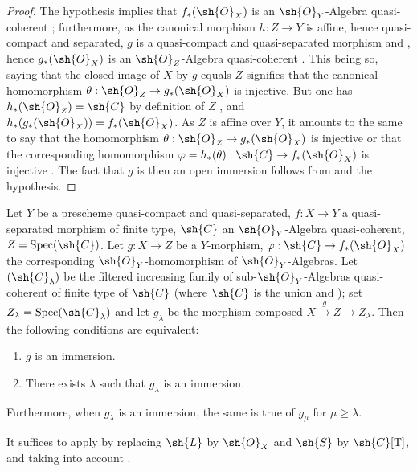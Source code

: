 \begin{proof}
The hypothesis implies that $f_*(\sh{O}_X)$ is an $\sh{O}_Y$-Algebra quasi-coherent ; furthermore, as the canonical morphism $h:Z\to Y$ is affine, hence quasi-compact and separated, $g$ is a quasi-compact and quasi-separated morphism  and , hence $g_*(\sh{O}_X)$ is an $\sh{O}_Z$-Algebra quasi-coherent .
This being so, saying that the closed image of $X$ by $g$ equals $Z$ signifies  that the canonical homomorphism $\theta:\sh{O}_Z\to g_*(\sh{O}_X)$ is injective.
But one has $h_*(\sh{O}_Z)=\sh{C}$ by definition of $Z$ , and $h_*(g_*(\sh{O}_X))=f_*(\sh{O}_X)$.
As $Z$ is affine over $Y$, it amounts to the same to say that the homomorphism $\theta:\sh{O}_Z\to g_*(\sh{O}_X)$ is injective or that the corresponding homomorphism $\varphi=h_*(\theta):\sh{C}\to f_*(\sh{O}_X)$ is injective .
The fact that $g$ is then an open immersion follows from  and the hypothesis.
\end{proof}

\begin{lemma}[8.12.2]
\label{IV.8.12.2}
Let $Y$ be a prescheme quasi-compact and quasi-separated, $f:X\to Y$ a quasi-separated morphism of finite type, $\sh{C}$ an $\sh{O}_Y$-Algebra quasi-coherent, $Z=\operatorname{Spec}(\sh{C})$.
Let $g:X\to Z$ be a $Y$-morphism, $\varphi:\sh{C}\to f_*(\sh{O}_X)$ the corresponding $\sh{O}_Y$-homomorphism of $\sh{O}_Y$-Algebras.
Let $(\sh{C}_\lambda)$ be the filtered increasing family of sub-$\sh{O}_Y$-Algebras quasi-coherent of finite type of $\sh{C}$ (where $\sh{C}$ is the union  and ); set $Z_\lambda=\operatorname{Spec}(\sh{C}_\lambda)$ and let $g_\lambda$ be the morphism composed $X\xrightarrow{g}Z\to Z_\lambda$.
Then the following conditions are equivalent:
\begin{enumerate}[label=\emph{\alph*)}]
  \item $g$ is an immersion.
  \item There exists $\lambda$ such that $g_\lambda$ is an immersion.
\end{enumerate}
Furthermore, when $g_\lambda$ is an immersion, the same is true of $g_\mu$ for $\mu\geqslant\lambda$.

It suffices to apply  by replacing $\sh{L}$ by $\sh{O}_X$ and $\sh{S}$ by $\sh{C}[\mathrm{T}]$, and taking into account .
\end{lemma}

